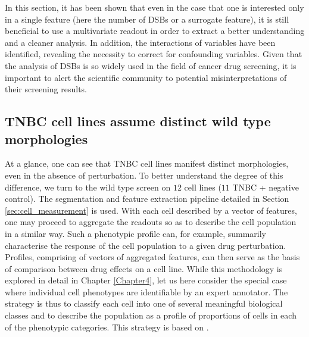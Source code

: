 
In this section, it has been shown that even in the case that one is interested only in a single feature (here the number of DSBs or a surrogate feature), it is still beneficial to use a multivariate readout in order to extract a better understanding and a cleaner analysis. In addition, the interactions of variables have been identified, revealing the necessity to correct for confounding variables. Given that the analysis of DSBs is so widely used in the field of cancer drug screening, it is important to alert the scientific community to potential misinterpretations of their screening results.

%

\subsection{TNBC cell lines assume distinct wild type morphologies}
\label{subsec:tnbc_classification}

At a glance, one can see that TNBC cell lines manifest distinct morphologies, even in the absence of perturbation. To better understand the degree of this difference, we turn to the wild type screen on $12$ cell lines ($11$ TNBC + negative control). The segmentation and feature extraction pipeline detailed in Section \ref{sec:cell_measurement} is used. With each cell described by a vector of features, one may proceed to aggregate the readouts so as to describe the cell population in a similar way. Such a phenotypic profile can, for example, summarily characterise the response of the cell population to a given drug perturbation. Profiles, comprising of vectors of aggregated features, can then serve as the basis of comparison between drug effects on a cell line. While this methodology is explored in detail in Chapter \ref{Chapter4}, let us here consider the special case where individual cell phenotypes are identifiable by an expert annotator. The strategy is thus to classify each cell into one of several meaningful biological classes and to describe the population as a profile of proportions of cells in each of the phenotypic categories. This strategy is based on \cite{neumann2010phenotypic}.

